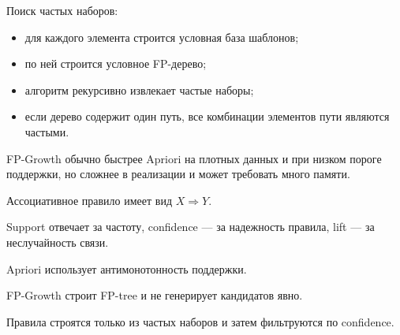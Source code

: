 Поиск частых наборов:
\begin{itemize}
    \item для каждого элемента строится условная база шаблонов;
    \item по ней строится условное FP-дерево;
    \item алгоритм рекурсивно извлекает частые наборы;
    \item если дерево содержит один путь, все комбинации элементов пути являются частыми.
\end{itemize}

FP-Growth обычно быстрее Apriori на плотных данных и при низком пороге поддержки, но сложнее в реализации и может требовать много памяти.

\begin{important}
    \item Ассоциативное правило имеет вид $X\Rightarrow Y$.
    \item Support отвечает за частоту, confidence --- за надежность правила, lift --- за неслучайность связи.
    \item Apriori использует антимонотонность поддержки.
    \item FP-Growth строит FP-tree и не генерирует кандидатов явно.
    \item Правила строятся только из частых наборов и затем фильтруются по confidence.
\end{important}
